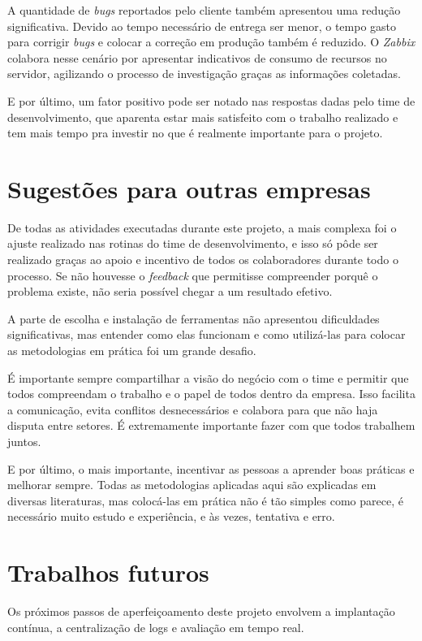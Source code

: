 \documentclass[
	12pt,				%
	openright,			%
	oneside,			%
	a4paper,			%
	english,			%
	french,				%
	spanish,			%
	brazil,				%
	]{abntex2}
\begin{document}
A quantidade de \textit{bugs} reportados pelo cliente também apresentou uma redução significativa. Devido ao tempo necessário de entrega ser menor, o tempo gasto para corrigir \textit{bugs} e colocar a correção em produção também é reduzido. O \textit{Zabbix} colabora nesse cenário por apresentar indicativos de consumo de recursos no servidor, agilizando o processo de investigação graças as informações coletadas.

E por último, um fator positivo pode ser notado nas respostas dadas pelo time de desenvolvimento, que aparenta estar mais satisfeito com o trabalho realizado e tem mais tempo pra investir no que é realmente importante para o projeto.

\chapter{Sugestões para outras empresas}

De todas as atividades executadas durante este projeto, a mais complexa foi o ajuste realizado nas rotinas do time de desenvolvimento, e isso só pôde ser realizado graças ao apoio e incentivo de todos os colaboradores durante todo o processo. Se não houvesse o \textit{feedback} que permitisse compreender porquê o problema existe, não seria possível chegar a um resultado efetivo.

A parte de escolha e instalação de ferramentas não apresentou dificuldades significativas, mas entender como elas funcionam e como utilizá-las para colocar as metodologias em prática foi um grande desafio.

É importante sempre compartilhar a visão do negócio com o time e permitir que todos compreendam o trabalho e o papel de todos dentro da empresa. Isso facilita a comunicação, evita conflitos desnecessários e colabora para que não haja disputa entre setores. É extremamente importante fazer com que todos trabalhem juntos.

E por último, o mais importante, incentivar as pessoas a aprender boas práticas e melhorar sempre. Todas as metodologias aplicadas aqui são explicadas em diversas literaturas, mas colocá-las em prática não é tão simples como parece, é necessário muito estudo e experiência, e às vezes, tentativa e erro.

\chapter{Trabalhos futuros}

Os próximos passos de aperfeiçoamento deste projeto envolvem a implantação contínua, a centralização de logs e avaliação em tempo real.
\end{document}
